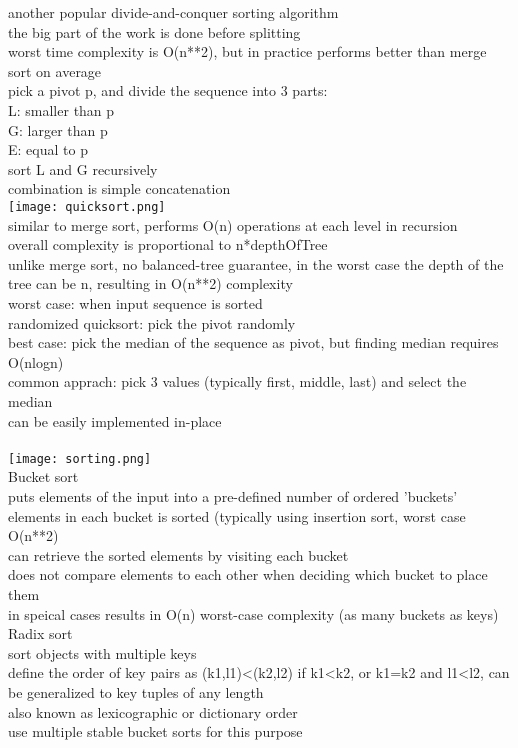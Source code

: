 {\tiny another popular divide-and-conquer sorting algorithm \\
the big part of the work is done before splitting\\
worst time complexity is O(n**2), but in practice performs better than merge sort on average\\
pick a pivot p, and divide the sequence into 3 parts:\\
L: smaller than p\\
G: larger than p\\
E: equal to p\\
sort L and G recursively\\
combination is simple concatenation\\
\texttt{[image: quicksort.png]}\\
similar to merge sort, performs O(n) operations at each level in recursion\\
overall complexity is proportional to n*depthOfTree\\
unlike merge sort, no balanced-tree guarantee, in the worst case the depth of the tree can be n, resulting in O(n**2) complexity\\
worst case: when input sequence is sorted\\
randomized quicksort: pick the pivot randomly\\
best case: pick the median of the sequence as pivot, but finding median requires O(nlogn)\\
common apprach: pick 3 values (typically first, middle, last) and select the median\\
can be easily implemented in-place\\
}\\
\texttt{[image: sorting.png]}\\
\scriptsize{Bucket sort}\\
{\tiny puts elements of the input into a pre-defined number of ordered 'buckets' \\
elements in each bucket is sorted (typically using insertion sort, worst case O(n**2)\\
can retrieve the sorted elements by visiting each bucket\\
does not compare elements to each other when deciding which bucket to place them\\
in speical cases results in O(n) worst-case complexity (as many buckets as keys)
}\\
\scriptsize{Radix sort}\\
{\tiny sort objects with multiple keys\\
define the order of key pairs as (k1,l1)<(k2,l2) if k1<k2, or k1=k2 and l1<l2, can be generalized to key tuples of any length\\
also known as lexicographic or dictionary order\\
use multiple stable bucket sorts for this purpose
}